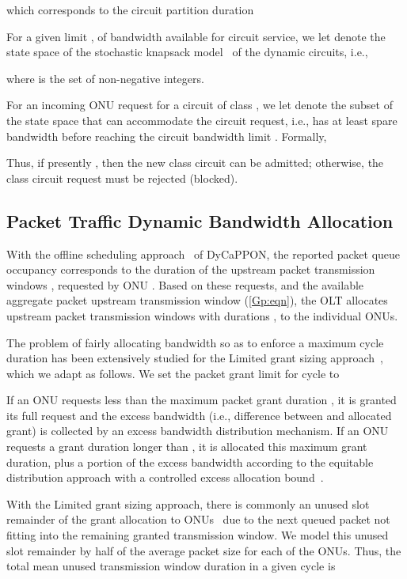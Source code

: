 \documentclass[article]{IEEEtran}
\begin{document}
which corresponds to the circuit partition duration

For a given limit , of bandwidth available for
circuit service, we let
 denote the state space of the
stochastic knapsack model~\cite{Ross95} of the dynamic circuits, i.e.,

where  is the set of non-negative integers.

For an incoming ONU request for a circuit of class , we let
 denote the subset of the state space 
that can accommodate the circuit request, i.e.,
has at least spare bandwidth  before reaching
the circuit bandwidth limit . Formally,

Thus, if presently , then
the new class  circuit can be admitted; otherwise, the
class  circuit request must be rejected (blocked).


\subsection{Packet Traffic Dynamic Bandwidth Allocation}
\label{dba:sec}
With the offline scheduling approach~\cite{ZhMo09} of DyCaPPON,
the reported packet queue occupancy corresponds to the
duration of the upstream packet transmission windows
, requested by ONU .
Based on these requests, and the available aggregate
packet upstream transmission window  (\ref{Gp:eqn}),
the OLT allocates upstream packet transmission windows with durations
, to the individual ONUs.

The problem of fairly allocating bandwidth so as to enforce a
maximum cycle duration has been extensively studied for the Limited
grant sizing approach~\cite{AsYDA03,BSA06},
which we adapt as follows. We set the
packet grant limit for cycle  to

If an ONU requests less than the maximum packet grant
duration , it is granted its full request and the
excess bandwidth (i.e., difference between  and allocated
grant) is collected by an excess bandwidth distribution
mechanism.
If an ONU requests a grant duration longer than , it is allocated
this maximum grant duration, plus a portion of the excess
bandwidth according to the equitable distribution approach
with a controlled excess allocation bound~\cite{AYDA1103,BSA06}.

With the Limited grant sizing approach, there is commonly an unused
slot remainder of the grant allocation to
ONUs~\cite{KrMD2002,HaSM06,NaM06}
due to the next queued packet not fitting into the
remaining granted transmission window.
We model this unused slot remainder by half of the average
packet size  for each of the  ONUs.
Thus, the total mean unused transmission window duration
in a given cycle is
\end{document}
